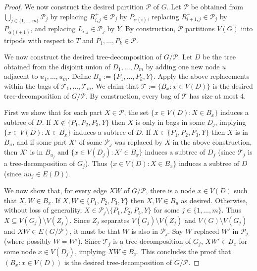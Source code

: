 \documentclass{patmorin}
\theoremstyle{plain}
\theoremstyle{definition}
\newcommand{\PP}{\mathcal{P}}
\begin{document}
\begin{proof}

We now construct the desired partition $\PP$ of $G$.
Let $\PP$ be obtained from $\bigcup_{j\in\{1,\dots,m\}} \PP_j$ by
replacing $R_{i,j}^+\in\PP_j$ by $P_{\alpha(i)}$,
replacing $R_{i+1,j}^-\in\PP_j$ by $P_{\alpha(i+1)}$, and
replacing $L_{i,j}\in\PP_j$ by $Y$.
By construction, $\PP$ partitions $V(G)$ into tripods with respect to $T$ and $P_1,\ldots,P_k\in \PP$.



We now construct the desired tree-decomposition of $G/\PP$. Let $D$ be the tree obtained from the disjoint union of $D_1,\dots,D_m$ by adding one new node $u$ adjacent to $u_1,\dots,u_m$. Define $B_u:=\{P_1,\dots,P_k,Y\}$. Apply the above replacements within the bags of $\mathcal{T}_1,\dots,\mathcal{T}_m$. We claim that $\mathcal{T}:=\{B_x:x\in V(D)\}$ is the desired tree-decomposition of $G/\PP$. By construction, every bag of $\mathcal{T}$ has size at most 4.

First we show that for each part $X\in\PP$, the set $\{x\in V(D) : X\in B_x\}$ induces a subtree of $D$. If $X\not\in \{P_1,P_2,P_3,Y\}$ then $X$ is only in bags in some $D_j$, implying $\{x\in V(D) : X\in B_x\}$ induces a subtree of $D$. If $X\in \{P_1,P_2,P_3,Y\}$ then $X$ is in $B_u$, and if some part $X'$ of some $\PP_j$ was replaced by $X$ in the above construction, then $X'$ is in $B_{u_j}$ and $\{x\in V(D_j):X'\in B_x\}$ induces a subtree of $D_j$ (since $\mathcal{T}_j$ is a tree-decomposition of $G_j$). Thus $\{x\in V(D) : X\in B_x\}$ induces a subtree of $D$ (since $uu_j\in E(D)$).

We now show that, for every edge $XW$ of $G/\PP$, there is a node $x\in V(D)$ such that $X,W\in B_x$. If $X,W\in \{P_1,P_2,P_3,Y\}$ then $X,W\in B_u$ as desired. Otherwise, without loss of generality, $X\in \PP_j\setminus \{P_1,P_2,P_3,Y\}$ for some $j\in\{1,\dots,m\}$.
Thus $X\subseteq V(G_j)\setminus V(Z_j)$. Since $Z_j$ separates $V(G_j)\setminus V(Z_j)$ and $V(G)\setminus V(G_j)$ and $XW\in E(G/\PP)$, it must be that $W$ is also in $\PP_j$. Say $W$ replaced $W'$ in $\PP_j$ (where possibly $W=W'$). Since $\mathcal{T}_j$ is a tree-decomposition of $G_j$, $XW'\in B_x$ for some node $x\in V(D_j)$, implying $XW\in B_x$. This concludes the proof that $(B_x:x\in V(D))$ is the desired tree-decomposition of $G/\PP$.


\end{proof}
\end{document}
